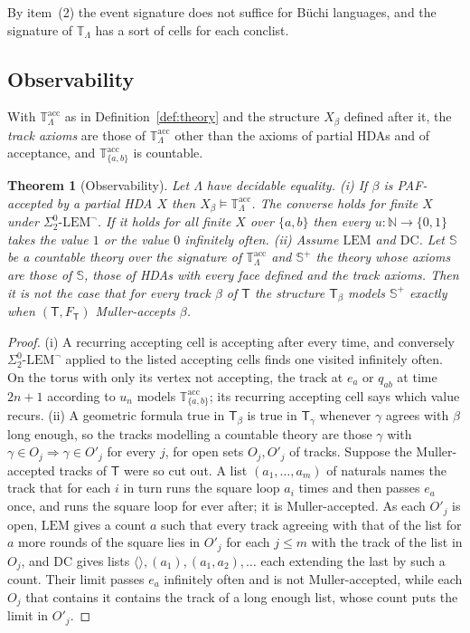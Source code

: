 \documentclass{lmcs}
\newtheorem{theorem}{Theorem}[section]
\theoremstyle{definition}
\theoremstyle{remark}
\newcommand{\Nn}{\mathbb{N}}
\newcommand{\Tt}{\mathbb{T}}
\newcommand{\ab}{\{a,b\}}
\newcommand{\prin}[1]{\mathrm{#1}}
\newcommand{\EM}{\prin{LEM}}
\newcommand{\EIO}{\Sigma^0_2\text{-}\prin{LEM}^{\neg}}
\newcommand{\TR}{\Tt_{\Lambda}}
\providecommand{\DC}{\prin{DC}}
\providecommand{\Tacc}{\Tt^{\mathrm{acc}}_{\Lambda}}
\providecommand{\FT}{F_{\mathsf{T}}}
\begin{document}
By item~(2) the event signature does not suffice for B\"uchi languages, and the signature of $\TR$ has a sort of
cells for each conclist.

\subsection{Observability}\label{ssec:muller-obs}

With $\Tacc$ as in Definition~\ref{def:theory} and the structure $X_\beta$ defined after it, the \emph{track axioms} are those of $\Tacc$ other than the
axioms of partial HDAs and of acceptance, and $\Tt^{\mathrm{acc}}_{\ab}$ is countable.

\begin{theorem}[Observability]\label{thm:muller-obs}
Let $\Lambda$ have decidable equality.
(i)\label{thm:muller-obs-acc} If $\beta$ is PAF-accepted by a partial HDA $X$ then $X_\beta\models\Tacc$. The converse holds for finite $X$
under $\EIO$. If it holds for all finite $X$ over $\ab$ then every $u\colon\Nn\to\{0,1\}$ takes the value $1$ or
the value $0$ infinitely
often.
(ii)\label{thm:muller-obs-torus} Assume $\EM$ and $\DC$. Let $\mathbb{S}$ be a countable theory over the signature of $\Tacc$ and
$\mathbb{S}^+$ the theory whose axioms are those of $\mathbb{S}$, those of HDAs with every face defined and the track
axioms. Then it is not the case that for every track $\beta$ of $\mathsf{T}$ the structure $\mathsf{T}_\beta$ models $\mathbb{S}^+$
exactly when $(\mathsf{T},\FT)$ Muller-accepts $\beta$.
\end{theorem}

\begin{proof}
(i) A recurring accepting cell is accepting after every time, and conversely
$\EIO$ applied to the listed accepting cells finds one visited infinitely often. On the torus with only its vertex not
accepting, the track at $e_a$ or $q_{ab}$ at time $2n+1$ according to $u_n$ models $\Tt^{\mathrm{acc}}_{\ab}$; its
recurring accepting cell says which value
recurs. (ii) A geometric
formula true in $\mathsf{T}_\beta$ is true in $\mathsf{T}_\gamma$ whenever $\gamma$ agrees with $\beta$ long
enough, so the tracks modelling a countable theory are those $\gamma$ with
$\gamma\in O_j\Rightarrow\gamma\in O'_j$ for every $j$, for open sets $O_j,O'_j$ of
tracks. Suppose the Muller-accepted tracks of $\mathsf{T}$ were so cut out.
A list $(a_1,\dots,a_m)$ of naturals names the track that for each $i$ in turn runs the square loop $a_i$ times and
then passes $e_a$ once, and runs the square loop for ever after; it is Muller-accepted.
As each $O'_j$ is open, $\EM$ gives a count $a$ such that every track agreeing with that of the list for $a$ more
rounds of the square lies in $O'_j$ for each $j\leq m$ with the track of the list in $O_j$,
and $\DC$ gives lists $\langle\rangle,(a_1),(a_1,a_2),\dots$ each extending the last by such a
count. Their limit passes $e_a$ infinitely often and is not Muller-accepted, while each $O_j$
that contains it contains the track of a long enough list, whose count puts the limit in
$O'_j$.
\end{proof}
\end{document}
